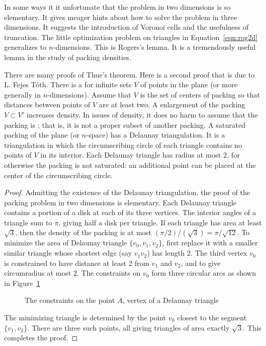 In some ways it it unfortunate that the problem in two dimensions is
so elementary.  It gives meager hints about how to solve the problem
in three dimensions.  It suggests the introduction of Voronoi cells
and the usefulness of truncation.  The little optimization problem on
triangles in Equation~\ref{eqn:rog2d} generalizes to $n$-dimensions.
This is Rogers's lemma.  It is a tremendously useful lemma in the
study of packing densities.


\bigskip

There are many proofs of Thue's theorem.  Here is a second proof that
is due to L. Fejes T\'oth.  There is a  for infinite sets $V$ of points in the plane (or more
generally in $n$-dimensions).  Assume that $V$ is the set of centers
of packing so that distances between points of $V$ are at least two.
A enlargement of the packing $V\subset V'$ increases density.  In
issues of density, it does no harm to assume that the packing is
; that is, it is not a proper subset of another
packing.  A saturated packing of the plane (or $n$-space) has a
Delaunay triangulation.  It is a triangulation in which the
circumscribing circle of each triangle contains no points of $V$ in
its interior.  Each Delaunay triangle has radius at most $2$, for
otherwise the packing is not saturated: an additional point can be
placed at the center of the circumscribing circle.

\begin{proof}
  Admitting the existence of the Delaunay triangulation, the proof of
  the packing problem in two dimensions is elementary.  Each Delaunay
  triangle contains a portion of a disk at each of its three vertices.
  The interior angles of a triangle sum to $\pi$, giving half a disk
  per triangle.  If each triangle has area at least $\sqrt{3}$, then
  the density of the packing is at most $(\pi/2)/(\sqrt{3}) =
  \pi/\sqrt{12}$.  To minimize the area of Delaunay triangle
  $\{v_0,v_1,v_2\}$, first replace it with a smaller similar triangle
  whose shortest edge (say $v_1v_2$) has length $2$.  The third vertex
  $v_0$ is constrained to have distance at least $2$ from $v_1$ and
  $v_2$, and to give circumradius at most $2$.  The constraints on
  $v_0$ form three circular arcs as shown in
  Figure~\ref{fig:2D-FT} %

\begin{figure}[htb]
  \centering
  \caption{The constraints on the point $A$, vertex of a Delaunay triangle}
  \label{fig:2D-FT}
\end{figure}

The minimizing triangle is determined by the point $v_0$ closest to
the segment $\{v_1,v_2\}$.  There are three such points, all giving
triangles of area exactly $\sqrt3$.  This completes the proof.
\end{proof}


